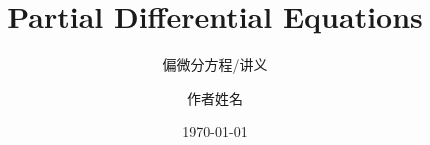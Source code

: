 \title{Partial Differential Equations}
\subtitle{偏微分方程\enspace /\enspace 讲义}
\coverreference{} %
\author{作者姓名}
\date{\today}
